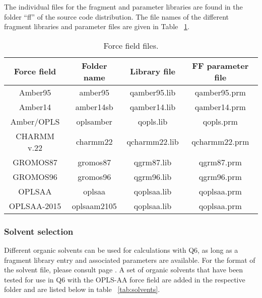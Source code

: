 \documentclass[a4paper,11pt]{article}
\let\origref\ref
\def\ref#1{\unskip~\origref{#1}}
\begin{document}




The individual files for the fragment and parameter libraries are found
in the folder ``ff'' of the source code distribution.
The file names of the different fragment libraries and parameter
files are given in Table \ref{tab:ff_files}.

\begin{table}[htbp]
\begin{center}
\caption{Force field files.}
\label{tab:ff_files}
\small
\begin{tabular}{|c|c|c|c|}
	\hline \textbf{Force field} & \textbf{Folder name} & \textbf{Library file} & \textbf{FF parameter file} \\
	\hline Amber95              & amber95     & qamber95.lib          & qamber95.prm \\
	\hline Amber14              & amber14sb   & qamber14.lib          & qamber14.prm \\
	\hline Amber/OPLS           & oplsamber   & qopls.lib             & qopls.prm \\
	\hline CHARMM v.22          & charmm22    & qcharmm22.lib         & qcharmm22.prm \\
	\hline GROMOS87             & gromos87    & qgrm87.lib            & qgrm87.prm \\
	\hline GROMOS96             & gromos96    & qgrm96.lib            & qgrm96.prm \\
	\hline OPLSAA               & oplsaa      & qoplsaa.lib           & qoplsaa.prm \\
	\hline OPLSAA-2015          & oplsaam2105 & qoplsaa.lib           & qoplsaa.prm \\
\hline
\end{tabular}
\normalsize
\end{center}
\end{table}

\subsubsection{Solvent selection}\label{subsubsec:solvselct}
Different organic solvents can be used for calculations with Q6, as long as 
a fragment library entry and associated parameters are available. For the 
format of the solvent file, please consult page \pageref{subsubsec:solvent_file_format}.
A set of organic solvents that have been tested for use in Q6 with the OPLS-AA force field are
added in the respective folder and are listed below in table \ref{tab:solvents}.
\end{document}
